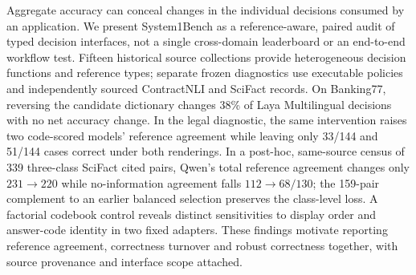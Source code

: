 Aggregate accuracy can conceal changes in the individual decisions consumed by an application. We present System1Bench as a reference-aware, paired audit of typed decision interfaces, not a single cross-domain leaderboard or an end-to-end workflow test. Fifteen historical source collections provide heterogeneous decision functions and reference types; separate frozen diagnostics use executable policies and independently sourced ContractNLI and SciFact records. On Banking77, reversing the candidate dictionary changes 38\% of Laya Multilingual decisions with no net accuracy change. In the legal diagnostic, the same intervention raises two code-scored models' reference agreement while leaving only 33/144 and 51/144 cases correct under both renderings. In a post-hoc, same-source census of 339 three-class SciFact cited pairs, Qwen's total reference agreement changes only $231\to220$ while no-information agreement falls $112\to68/130$; the 159-pair complement to an earlier balanced selection preserves the class-level loss. A factorial codebook control reveals distinct sensitivities to display order and answer-code identity in two fixed adapters. These findings motivate reporting reference agreement, correctness turnover and robust correctness together, with source provenance and interface scope attached.
